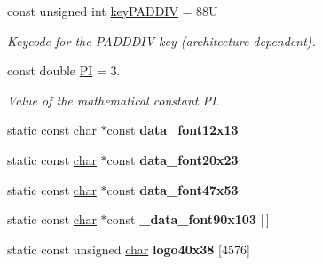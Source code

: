 \begin{DoxyCompactItemize}
\mbox{\label{namespacecimg__library__suffixed_1_1cimg_a1c7136ef19c09eafa226d6192203a37a}} 
const unsigned int \hyperlink{namespacecimg__library__suffixed_1_1cimg_a1c7136ef19c09eafa226d6192203a37a}{key\+P\+A\+D\+D\+IV} = 88U
\begin{DoxyCompactList}\small\item\em Keycode for the {\ttfamily P\+A\+D\+D\+D\+IV} key (architecture-\/dependent). \end{DoxyCompactList}\item 
\mbox{\label{namespacecimg__library__suffixed_1_1cimg_af1864f3c9389e27966891b286b442980}} 
const double \hyperlink{namespacecimg__library__suffixed_1_1cimg_af1864f3c9389e27966891b286b442980}{PI} = 3.
\begin{DoxyCompactList}\small\item\em Value of the mathematical constant PI. \end{DoxyCompactList}\item 
\mbox{\label{namespacecimg__library__suffixed_1_1cimg_aead6ee9a642f030827109e046dc5b536}} 
static const \hyperlink{classchar}{char} $\ast$const {\bfseries data\+\_\+font12x13}
\item 
\mbox{\label{namespacecimg__library__suffixed_1_1cimg_a3bb7d5b9f629378053138e4add8f2d43}} 
static const \hyperlink{classchar}{char} $\ast$const {\bfseries data\+\_\+font20x23}
\item 
\mbox{\label{namespacecimg__library__suffixed_1_1cimg_a593f989c9b68c45842308376fb25d3be}} 
static const \hyperlink{classchar}{char} $\ast$const {\bfseries data\+\_\+font47x53}
\item 
\mbox{\label{namespacecimg__library__suffixed_1_1cimg_a93b7d3113e0a13b534035284e29671fa}} 
static const \hyperlink{classchar}{char} $\ast$const {\bfseries \+\_\+data\+\_\+font90x103} \mbox{[}$\,$\mbox{]}
\item 
static const unsigned \hyperlink{classchar}{char} {\bfseries logo40x38} \mbox{[}4576\mbox{]}
\end{DoxyCompactItemize}


